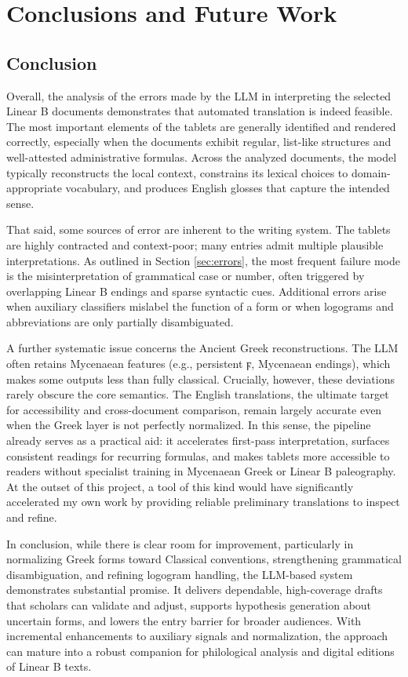 \chapter{Conclusions and Future Work} \label{chap:conclusion}

\section{Conclusion}
Overall, the analysis of the errors made by the LLM in interpreting the selected Linear B documents demonstrates that automated translation is indeed feasible. The most important elements of the tablets are generally identified and rendered correctly, especially when the documents exhibit regular, list-like structures and well-attested administrative formulas.
Across the analyzed documents, the model typically reconstructs the local context, constrains its lexical choices to domain-appropriate vocabulary, and produces English glosses that capture the intended sense.

That said, some sources of error are inherent to the writing system.
The tablets are highly contracted and context-poor; many entries admit multiple plausible interpretations.
As outlined in Section \ref{sec:errors}, the most frequent failure mode is the misinterpretation of grammatical case or number, often triggered by overlapping Linear B endings and sparse syntactic cues.
Additional errors arise when auxiliary classifiers mislabel the function of a form or when logograms and abbreviations are only partially disambiguated.

A further systematic issue concerns the Ancient Greek reconstructions.
The LLM often retains Mycenaean features (e.g., persistent \textgreek{ϝ}, Mycenaean endings), which makes some outputs less than fully classical.
Crucially, however, these deviations rarely obscure the core semantics.
The English translations, the ultimate target for accessibility and cross-document comparison, remain largely accurate even when the Greek layer is not perfectly normalized.
In this sense, the pipeline already serves as a practical aid: it accelerates first-pass interpretation, surfaces consistent readings for recurring formulas, and makes tablets more accessible to readers without specialist training in Mycenaean Greek or Linear B paleography.
At the outset of this project, a tool of this kind would have significantly accelerated my own work by providing reliable preliminary translations to inspect and refine.

In conclusion, while there is clear room for improvement, particularly in normalizing Greek forms toward Classical conventions, strengthening grammatical disambiguation, and refining logogram handling, the LLM-based system demonstrates substantial promise.
It delivers dependable, high-coverage drafts that scholars can validate and adjust, supports hypothesis generation about uncertain forms, and lowers the entry barrier for broader audiences.
With incremental enhancements to auxiliary signals and normalization, the approach can mature into a robust companion for philological analysis and digital editions of Linear B texts.

